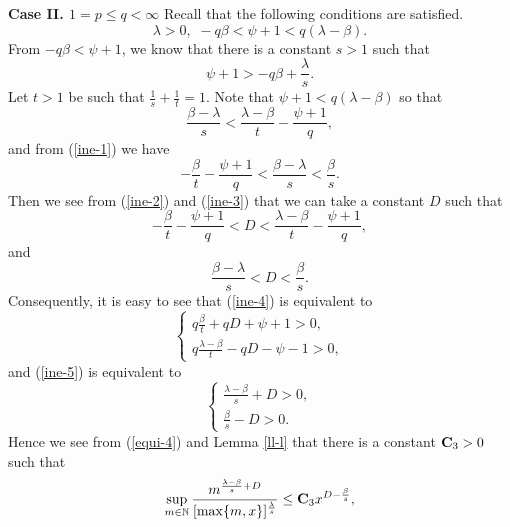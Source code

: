 \documentclass[10pt]{amsart}
\theoremstyle{definition}    %
\numberwithin{equation}{section}
\begin{document}
{\bf Case II. $1=p\leq q<\infty$}
Recall that the following conditions are satisfied. 
\begin{equation}\label{ee-2}\lambda>0,\,\, -q\beta<\psi+1<q(\lambda-\beta).\nonumber\end{equation}
From $-q\beta<\psi+1$, we know that there is a constant $s>1$ such that 
\begin{equation}\label{ine-1}\psi+1>-q\beta+\frac{\lambda}{s}.\end{equation}
Let $t>1$ be such that $\frac{1}{s}+\frac{1}{t}=1$. Note that $\psi+1<q(\lambda-\beta)$ so that 
\begin{equation}\label{ine-2}
\frac{\beta-\lambda}{s}<\frac{\lambda-\beta}{t}-\frac{\psi+1}{q},
\end{equation}
and from (\ref{ine-1}) we have  \begin{equation}\label{ine-3}
-\frac{\beta}{t}-\frac{\psi+1}{q}<\frac{\beta-\lambda}{s}<\frac{\beta}{s}.
\end{equation}
Then we see from (\ref{ine-2}) and (\ref{ine-3}) that we can take a constant $D$ such that
\begin{equation}\label{ine-4}
-\frac{\beta}{t}-\frac{\psi+1}{q}<D<\frac{\lambda-\beta}{t}-\frac{\psi+1}{q},
\end{equation}
and 
\begin{equation}\label{ine-5}
\frac{\beta-\lambda}{s}<D<\frac{\beta}{s}.
\end{equation}
Consequently, it is easy to see that (\ref{ine-4}) is equivalent to 
\begin{equation}\label{equi-3}
\begin{cases}
q\frac{\beta}{t}+qD+\psi+1>0, \\
q\frac{\lambda-\beta}{t}-qD-\psi-1>0, 
\end{cases}
\end{equation}
and  (\ref{ine-5}) is equivalent to  \begin{equation}\label{equi-4}
\begin{cases}
\frac{\lambda-\beta}{s}+D>0, \\
\frac{\beta}{s}-D>0. 
\end{cases}
\end{equation}
Hence we see from (\ref{equi-4}) and Lemma \ref{ll-l} that there is a constant ${\bf C}_3>0$ such that 
\begin{equation}
\sup_{m\in \mathbb{N}}\frac{m^{\frac{\lambda-\beta}{s}+D}}{[\max\{m,x\}]^{\frac{\lambda}{s}}} \leq {\bf C}_3 x^{D-\frac{\beta}{s}}, \nonumber 
\end{equation}
\end{document}
